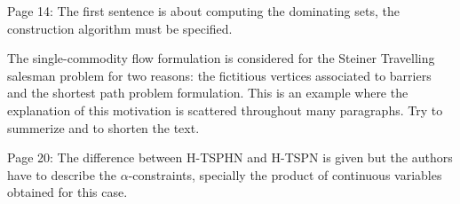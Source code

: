 \documentclass{article}
\newenvironment{reviewer}{\setcounter{pointcounter}{1}}{}
\newcommand{\point}{\text{{\selectfont \thepointcounter} \stepcounter{pointcounter}}}
\begin{document}
\begin{reviewer}
		\begin{itshape}
			Page 14: The first sentence is about computing the dominating sets, the construction algorithm must be specified.
		\end{itshape}
		
		\begin{tcolorbox}[breakable,enhanced,coltitle=black,colback=red!5!white,colframe=red!75!black,title=\textbf{Answer R1.\point},borderline={1pt}{0pt}{black},boxrule=0pt]


		\end{tcolorbox}
		
		\begin{itshape}
			The single-commodity flow formulation is considered for the Steiner Travelling salesman
			problem for two reasons: the fictitious vertices associated to barriers and the shortest path
			problem formulation. This is an example where the explanation of this motivation is scattered
			throughout many paragraphs. Try to summerize and to shorten the text.
		\end{itshape}
		
		\begin{tcolorbox}[breakable,enhanced,coltitle=black,colback=red!5!white,colframe=red!75!black,title=\textbf{Answer R1.\point},borderline={1pt}{0pt}{black},boxrule=0pt]

		\end{tcolorbox}
		
		\begin{itshape}
			Page 20: The difference between H-TSPHN and H-TSPN is given but the authors have to describe the $\alpha$-constraints, specially the product of continuous variables obtained for this case.
		\end{itshape}
		
		\begin{tcolorbox}[breakable,enhanced,coltitle=black,colback=red!5!white,colframe=red!75!black,title=\textbf{Answer R1.\point},borderline={1pt}{0pt}{black},boxrule=0pt]

		\end{tcolorbox}
		

\end{reviewer}
\end{document}
